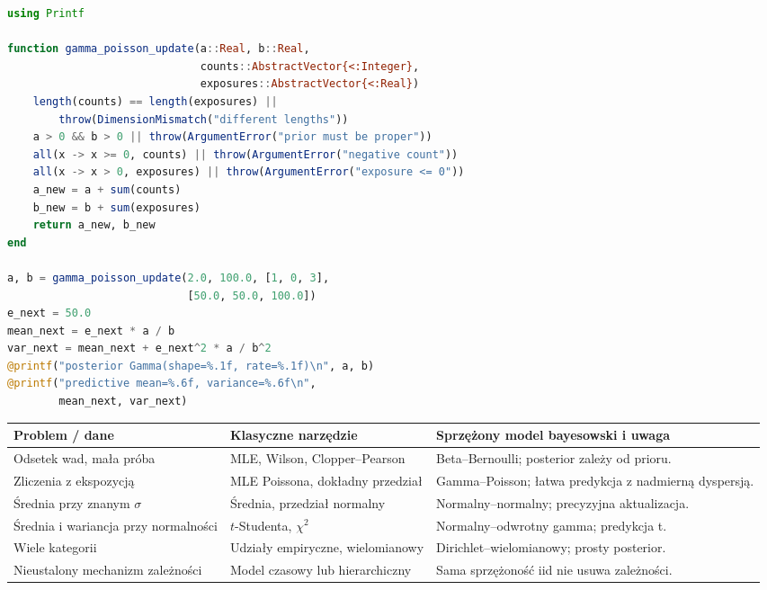 \documentclass[11pt,a4paper,oneside]{report}
\numberwithin{equation}{chapter}
\theoremstyle{plain}
\theoremstyle{definition}
\theoremstyle{remark}
\begin{document}
\begin{lstlisting}[language=Julia,caption={Kompletny program: aktualizacja sprzężona i predykcja gamma--Poisson (Julia, biblioteka standardowa).}]
using Printf

function gamma_poisson_update(a::Real, b::Real,
                              counts::AbstractVector{<:Integer},
                              exposures::AbstractVector{<:Real})
    length(counts) == length(exposures) ||
        throw(DimensionMismatch("different lengths"))
    a > 0 && b > 0 || throw(ArgumentError("prior must be proper"))
    all(x -> x >= 0, counts) || throw(ArgumentError("negative count"))
    all(x -> x > 0, exposures) || throw(ArgumentError("exposure <= 0"))
    a_new = a + sum(counts)
    b_new = b + sum(exposures)
    return a_new, b_new
end

a, b = gamma_poisson_update(2.0, 100.0, [1, 0, 3],
                            [50.0, 50.0, 100.0])
e_next = 50.0
mean_next = e_next * a / b
var_next = mean_next + e_next^2 * a / b^2
@printf("posterior Gamma(shape=%.1f, rate=%.1f)\n", a, b)
@printf("predictive mean=%.6f, variance=%.6f\n",
        mean_next, var_next)
\end{lstlisting}

\begin{center}\small
\begin{tabular}{>{\raggedright\arraybackslash}p{}>{\raggedright\arraybackslash}p{}>{\raggedright\arraybackslash}p{}}
\toprule
\textbf{Problem / dane} & \textbf{Klasyczne narzędzie} & \textbf{Sprzężony model bayesowski i uwaga}\\
\midrule
Odsetek wad, mała próba & MLE, Wilson, Clopper--Pearson & Beta--Bernoulli; posterior zależy od prioru.\\
Zliczenia z ekspozycją & MLE Poissona, dokładny przedział & Gamma--Poisson; łatwa predykcja z nadmierną dyspersją.\\
Średnia przy znanym $\sigma$ & Średnia, przedział normalny & Normalny--normalny; precyzyjna aktualizacja.\\
Średnia i wariancja przy normalności & $t$-Studenta, $\chi^2$ & Normalny--odwrotny gamma; predykcja t.\\
Wiele kategorii & Udziały empiryczne, wielomianowy & Dirichlet--wielomianowy; prosty posterior.\\
Nieustalony mechanizm zależności & Model czasowy lub hierarchiczny & Sama sprzężoność iid nie usuwa zależności.\\
\bottomrule
\end{tabular}
\end{center}
\end{document}
